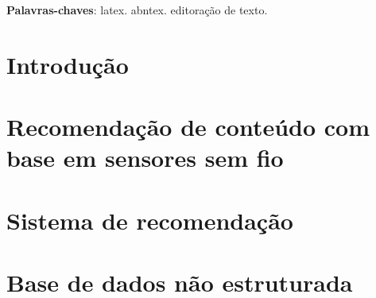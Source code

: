 \documentclass[
	article,			%
	12pt,				%
	oneside,			%
	a4paper,			%
	english,			%
	brazil,				%
	sumario=tradicional
	]{abntex2}
\begin{document}
\frenchspacing 


%
%
\maketitle

\begin{resumoumacoluna}

 
 \vspace{\onelineskip}
 
 \noindent
 \textbf{Palavras-chaves}: latex. abntex. editoração de texto.
\end{resumoumacoluna}


\textual

\section*{Introdução}


\section{Recomendação de conteúdo com base em sensores sem fio}

\section{Sistema de recomendação}

\section{Base de dados não estruturada}
\end{document}
